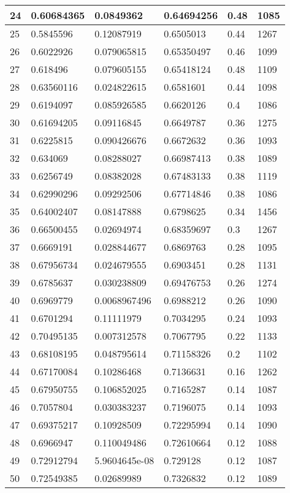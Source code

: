 \begin{longtable}{|l|l|l|l|l|l|}
24 & 0.60684365 & 0.0849362 & 0.64694256 & 0.48 & 1085 \\ \hline 
25 & 0.5845596 & 0.12087919 & 0.6505013 & 0.44 & 1267 \\ \hline 
26 & 0.6022926 & 0.079065815 & 0.65350497 & 0.46 & 1099 \\ \hline 
27 & 0.618496 & 0.079605155 & 0.65418124 & 0.48 & 1109 \\ \hline 
28 & 0.63560116 & 0.024822615 & 0.6581601 & 0.44 & 1098 \\ \hline 
29 & 0.6194097 & 0.085926585 & 0.6620126 & 0.4 & 1086 \\ \hline 
30 & 0.61694205 & 0.09116845 & 0.6649787 & 0.36 & 1275 \\ \hline 
31 & 0.6225815 & 0.090426676 & 0.6672632 & 0.36 & 1093 \\ \hline 
32 & 0.634069 & 0.08288027 & 0.66987413 & 0.38 & 1089 \\ \hline 
33 & 0.6256749 & 0.08382028 & 0.67483133 & 0.38 & 1119 \\ \hline 
34 & 0.62990296 & 0.09292506 & 0.67714846 & 0.38 & 1086 \\ \hline 
35 & 0.64002407 & 0.08147888 & 0.6798625 & 0.34 & 1456 \\ \hline 
36 & 0.66500455 & 0.02694974 & 0.68359697 & 0.3 & 1267 \\ \hline 
37 & 0.6669191 & 0.028844677 & 0.6869763 & 0.28 & 1095 \\ \hline 
38 & 0.67956734 & 0.024679555 & 0.6903451 & 0.28 & 1131 \\ \hline 
39 & 0.6785637 & 0.030238809 & 0.69476753 & 0.26 & 1274 \\ \hline 
40 & 0.6969779 & 0.0068967496 & 0.6988212 & 0.26 & 1090 \\ \hline 
41 & 0.6701294 & 0.11111979 & 0.7034295 & 0.24 & 1093 \\ \hline 
42 & 0.70495135 & 0.007312578 & 0.7067795 & 0.22 & 1133 \\ \hline 
43 & 0.68108195 & 0.048795614 & 0.71158326 & 0.2 & 1102 \\ \hline 
44 & 0.67170084 & 0.10286468 & 0.7136631 & 0.16 & 1262 \\ \hline 
45 & 0.67950755 & 0.106852025 & 0.7165287 & 0.14 & 1087 \\ \hline 
46 & 0.7057804 & 0.030383237 & 0.7196075 & 0.14 & 1093 \\ \hline 
47 & 0.69375217 & 0.10928509 & 0.72295994 & 0.14 & 1090 \\ \hline 
48 & 0.6966947 & 0.110049486 & 0.72610664 & 0.12 & 1088 \\ \hline 
49 & 0.72912794 & 5.9604645e-08 & 0.729128 & 0.12 & 1087 \\ \hline 
50 & 0.72549385 & 0.02689989 & 0.7326832 & 0.12 & 1089 \\ \hline 
\end{longtable}